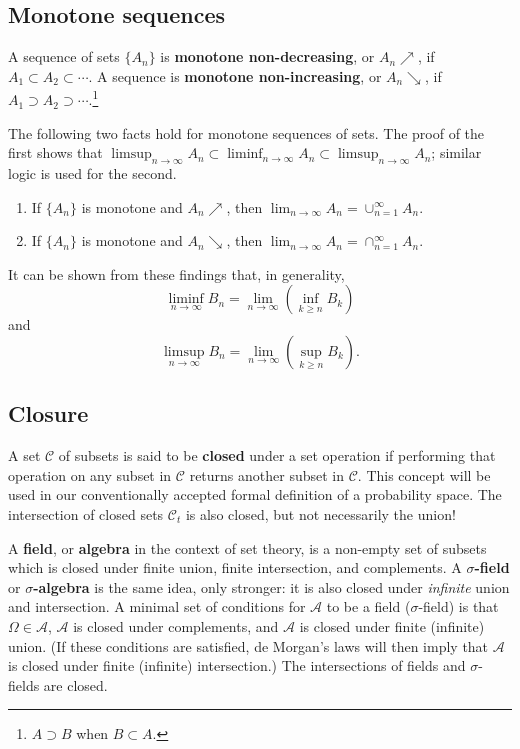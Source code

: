 \documentclass[12pt]{article}
\begin{document}
\subsection{Monotone sequences}

A sequence of sets $\{ A_n \}$ is \textbf{monotone non-decreasing}, or $A_n \nearrow$, if $A_1 \subset A_2 \subset \cdots$. A sequence is \textbf{monotone non-increasing}, or $A_n \searrow$, if $A_1 \supset A_2 \supset \cdots$.\footnote{$A \supset B$ when $B \subset A$.}

The following two facts hold for monotone sequences of sets. The proof of the first shows that $\limsup_{n \to \infty} A_n \subset \liminf_{n \to \infty} A_n \subset  \limsup_{n \to \infty} A_n$; similar logic is used for the second.
\begin{enumerate}
\item If $\{ A_n \}$ is monotone and $A_n \nearrow$, then $\lim_{n \to \infty} A_n = \cup_{n = 1}^\infty A_n$.
\item If $\{ A_n \}$ is monotone and $A_n \searrow$, then $\lim_{n \to \infty} A_n = \cap_{n = 1}^\infty A_n$.
\end{enumerate}
It can be shown from these findings that, in generality,
\[ \liminf_{n \to \infty} B_n = \lim_{n \to \infty} \left( \inf_{k \geq n} B_k \right) \]
and
\[ \limsup_{n \to \infty} B_n = \lim_{n \to \infty} \left( \sup_{k \geq n} B_k \right). \]

\subsection{Closure}

A set $\mathcal C$ of subsets is said to be \textbf{closed} under a set operation if performing that operation on any subset in $\mathcal C$ returns another subset in $\mathcal C$. This concept will be used in our conventionally accepted formal definition of a probability space. The intersection of closed sets $\mathcal C_t$ is also closed, but not necessarily the union!

A \textbf{field}, or \textbf{algebra} in the context of set theory, is a non-empty set of subsets which is closed under finite union, finite intersection, and complements. A \textbf{$\sigma$-field} or \textbf{$\sigma$-algebra} is the same idea, only stronger: it is also closed under \emph{infinite} union and intersection. A minimal set of conditions for $\mathcal A$ to be a field ($\sigma$-field) is that $\Omega \in \mathcal A$, $\mathcal A$ is closed under complements, and $\mathcal A$ is closed under finite (infinite) union. (If these conditions are satisfied, de Morgan's laws will then imply that $\mathcal A$ is closed under finite (infinite) intersection.) The intersections of fields and $\sigma$-fields are closed.
\end{document}
